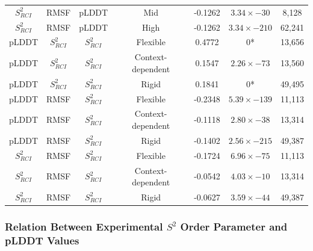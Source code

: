 \begin{table}[htb]
\begin{tabular}{ccccccc}
$S^{2}_{RCI}$ & RMSF          & pLDDT         & Mid               & -0.1262 & \(3.34 \times -30\)  & 8,128   \\
$S^{2}_{RCI}$ & RMSF          & pLDDT         & High              & -0.1262 & \(3.34 \times -210\) & 62,241  \\
\arrayrulecolor[gray]{0.8}\hline
pLDDT         & $S^{2}_{RCI}$ & $S^{2}_{RCI}$ & Flexible          & 0.4772  & 0*                     & 13,656  \\
pLDDT         & $S^{2}_{RCI}$ & $S^{2}_{RCI}$ & Context-dependent & 0.1547  & \(2.26 \times -73\)  & 13,560  \\
pLDDT         & $S^{2}_{RCI}$ & $S^{2}_{RCI}$ & Rigid             & 0.1841  & 0*                     & 49,495  \\
\arrayrulecolor[gray]{0.8}\hline
pLDDT         & RMSF          & $S^{2}_{RCI}$ & Flexible          & -0.2348 & \(5.39 \times -139\) & 11,113  \\
pLDDT         & RMSF          & $S^{2}_{RCI}$ & Context-dependent & -0.1118 & \(2.80 \times -38\)  & 13,314  \\
pLDDT         & RMSF          & $S^{2}_{RCI}$ & Rigid             & -0.1402 & \(2.56 \times -215\) & 49,387  \\
\arrayrulecolor[gray]{0.8}\hline
$S^{2}_{RCI}$ & RMSF          & $S^{2}_{RCI}$ & Flexible          & -0.1724 & \(6.96 \times -75\)  & 11,113  \\
$S^{2}_{RCI}$ & RMSF          & $S^{2}_{RCI}$ & Context-dependent & -0.0542 & \(4.03 \times -10\)  & 13,314  \\
$S^{2}_{RCI}$ & RMSF          & $S^{2}_{RCI}$ & Rigid             & -0.0627 & \(3.59 \times -44\)  & 49,387  \\ \hline
\end{tabular}
\label{table:pearson_metrics}
\end{table}


\subsubsection{Relation Between Experimental $S^{2}$ Order Parameter and pLDDT Values}

